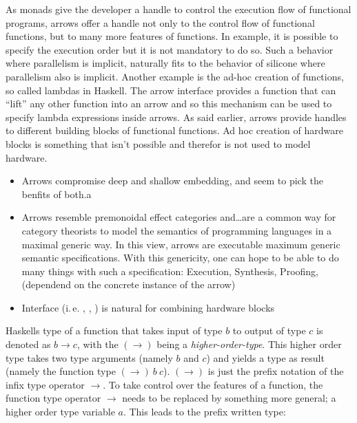 \documentclass{article}
\begin{document}
\par
As monads give the developer a handle to control the execution flow of functional programs, arrows offer a handle not only to the control
flow of functional functions, but to many more features of functions. In example, it is possible to specify the execution order but it is
not mandatory to do so. Such a behavior where parallelism is implicit, naturally fits to the behavior of silicone where parallelism also is
implicit. Another example is the ad-hoc creation of functions, so called lambdas in Haskell. The arrow interface provides a function that
can ``lift'' any other function into an arrow and so this mechanism can be used to specify lambda expressions inside arrows. As said
earlier, arrows provide handles to different building blocks of functional functions. Ad hoc creation of hardware blocks is something that
isn't possible and therefor is not used to model hardware. %

\begin{itemize}
\item Arrows compromise deep and shallow embedding, and seem to pick the benfits of both.a
\item Arrows resemble premonoidal effect categories and\ldots   are a common way for category theorists to model the
semantics of programming languages in a maximal generic way. In this view, arrows are executable maximum generic
semantic specifications. With this genericity, one can hope to be able to do many things with such a specification:
Execution, Synthesis, Proofing, (dependend on the concrete instance of the arrow)
\item Interface (i.\,e. \hs{***}, \hs{&&&}, \hs{>>>}) is natural for combining hardware blocks
\end{itemize}

\par
Haskells type of a function that takes input of type $b$ to output of type $c$ is denoted as $b \rightarrow c$, with the $(\rightarrow)$
being a \emph{higher-order-type}. This higher order type takes two type arguments (namely $b$ and $c$) and yields a type as result (namely
the function type $(\rightarrow)\ b\ c$). $(\rightarrow)$ is just the prefix notation of the infix type operator $\rightarrow$. To take
control over the features of a function, the function type operator $\rightarrow$ needs to be replaced by something more general; a higher
order type variable $a$. This leads to the prefix written type:
\end{document}
